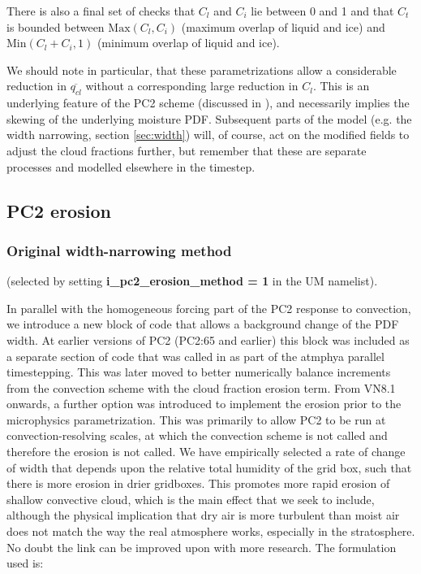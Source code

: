 \documentclass{UMDP_article}
\begin{document}
There is also a final set of checks that $C_l$ and $C_i$ lie
between 0 and 1 and that $C_t$ is bounded between $\text{Max}(C_l, C_i)$
(maximum overlap of liquid and ice) and $\text{Min}(C_l+C_i,1)$
(minimum overlap of liquid and ice).

We should note in particular, that these parametrizations allow a
considerable reduction in $\overline{q_{cl}}$ without a corresponding
large reduction in $C_l$. This is an underlying feature of the PC2 scheme
(discussed in \cite{wg03}), and necessarily implies the
skewing of the underlying moisture PDF. Subsequent parts of
the model (e.g. the width narrowing, section \ref{sec:width}) will, of
course, act on the modified fields to adjust the cloud fractions further,
but remember that these are separate processes and modelled elsewhere in the
timestep.

\subsection{PC2 erosion}
\label{sec:turb}

\subsubsection{Original width-narrowing method}
(selected by setting {\bf i\_pc2\_erosion\_method = 1} in the UM namelist).

In parallel with the homogeneous forcing part of the PC2 response to
convection, we introduce
a new block of code that allows a background change of the PDF width.
At earlier versions of PC2 (PC2:65 and earlier) this block was included as
a separate section of code that was called in as part of the atmphya parallel
timestepping. This was later moved to better numerically balance
increments from
the convection scheme with the cloud fraction erosion term. From VN8.1 onwards, a further option was introduced to implement the erosion prior to the microphysics parametrization. This was primarily to allow PC2 to be run at convection-resolving scales, at which the convection scheme is not called and therefore the erosion is not called.
We have empirically selected a rate of change of width that depends upon the
relative total humidity of the grid box, such that there is more
erosion in drier gridboxes. This promotes more rapid erosion of
shallow convective cloud, which is the main effect that we seek to
include, although the physical implication that dry air is
more turbulent than moist air does not match the way the real atmosphere
works, especially in the
stratosphere. No doubt the link can be improved upon with more
research. The formulation used is:
\end{document}
